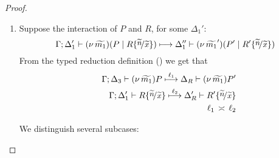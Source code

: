 \begin{proof}
\begin{enumerate}
		\item	Suppose the interaction of $P$ and $R$, for some $\Delta_1'$:
		\[
					\horel{\Gamma}{\Delta_1'}{\newsp{\widetilde{m_1}}{P \Par R \subst{\widetilde{n}}{\widetilde{x}} }}
					{\hby{}}
					{\Delta_1''}{\newsp{\widetilde{m_1}'}{P' \Par R' \subst{\widetilde{n}}{\widetilde{x}} }}
				\]
				From the typed reduction definition () we get that
				\begin{eqnarray}
					&&	\horel{\Gamma}{\Delta_3}{\news{\widetilde{m_1}}{P}}
						{\hby{\ell_1}}
						{\Delta_R}{\news{\widetilde{m_1}}{P'}}
					\label{lem:trigger_subst_31}
					\\
					&&	\horel{\Gamma}{\Delta_1'}{R \subst{\widetilde{n}}{\widetilde{x}} }
						{\hby{\ell_2}}
						{\Delta_R'}{R' \subst{\widetilde{n}}{\widetilde{x}} }
					\label{lem:trigger_subst_32}
					\\
					&&	\ell_1 \comp \ell_2 \nonumber
				\end{eqnarray}

				We distinguish several subcases:
				\begin{enumerate}[i.]
	

\end{enumerate}
\end{enumerate}
\end{proof}
